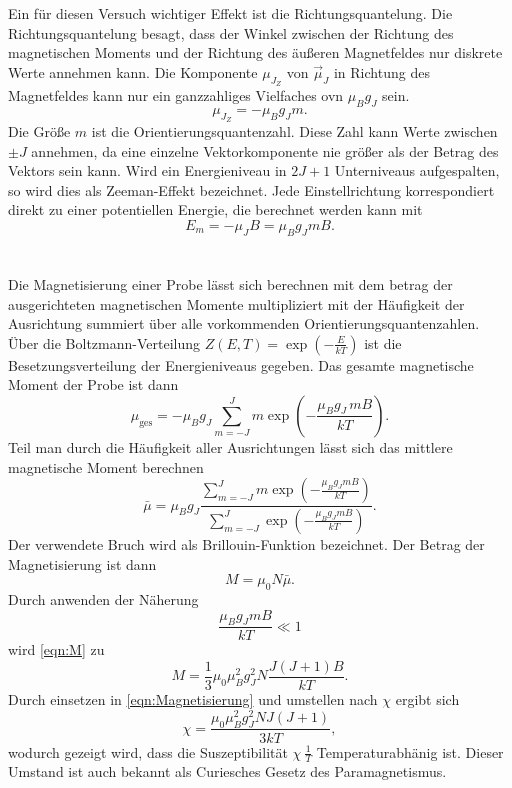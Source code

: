 Ein für diesen Versuch wichtiger Effekt ist die Richtungsquantelung.
Die Richtungsquantelung besagt, dass der Winkel zwischen der Richtung des magnetischen Moments und der Richtung des äußeren Magnetfeldes nur diskrete Werte annehmen kann.
Die Komponente $μ_{J_Z}$ von $\vec{μ}_J$ in Richtung des Magnetfeldes kann nur ein ganzzahliges Vielfaches ovn $μ_B g_J$ sein.
\begin{equation*}
    μ_{J_Z} = - μ_B g_J m.
\end{equation*}
Die Größe $m$ ist die Orientierungsquantenzahl. 
Diese Zahl kann Werte zwischen $\pm J$ annehmen, da eine einzelne Vektorkomponente nie größer als der Betrag des Vektors sein kann.
Wird ein Energieniveau in $2J+1$ Unterniveaus aufgespalten, so wird dies als Zeeman-Effekt bezeichnet.
Jede Einstellrichtung korrespondiert direkt zu einer potentiellen Energie, die berechnet werden kann mit
\begin{equation*}
    E_m = - μ_{J} B = μ_B g_J m B.
\end{equation*}
\\
\\
Die Magnetisierung einer Probe lässt sich berechnen mit dem betrag der ausgerichteten magnetischen Momente 
multipliziert mit der Häufigkeit der Ausrichtung summiert über alle vorkommenden Orientierungsquantenzahlen.
Über die Boltzmann-Verteilung $Z(E,T) = \exp(-\frac{E}{kT})$ ist die Besetzungsverteilung der Energieniveaus gegeben.
Das gesamte magnetische Moment der Probe ist dann
\begin{equation*}
    μ_{\text{ges}} = -μ_B g_J \sum_{m=-J}^{J} m \exp(-\frac{μ_B g_J\, m B}{kT}).
\end{equation*}
Teil man durch die Häufigkeit aller Ausrichtungen lässt sich das mittlere magnetische Moment berechnen
\begin{equation*}
    \bar{μ} = μ_B g_J \frac{\sum_{m=-J}^{J} m \exp(-\frac{μ_B g_J m B}{kT})}{\sum_{m=-J}^{J} \exp(-\frac{μ_B g_J m B}{kT})}.
\end{equation*}
Der verwendete Bruch wird als Brillouin-Funktion bezeichnet.
Der Betrag der Magnetisierung ist dann
\begin{equation}\label{eqn:M}
    M = μ_0 N \bar{μ}.
\end{equation}
Durch anwenden der Näherung
\begin{equation*}
    \frac{μ_B g_J m B}{kT} \ll 1
\end{equation*}
wird \autoref{eqn:M} zu
\begin{equation*}
    M = \frac{1}{3}μ_0 μ_B^2 g_J^2 N \frac{J(J + 1)B}{kT}.
\end{equation*}
Durch einsetzen in \autoref{eqn:Magnetisierung} und umstellen nach $χ$ ergibt sich
\begin{equation}\label{eqn:chi}
    χ = \frac{μ_0 μ_B^2 g_J^2 N J(J+1)}{3kT},
\end{equation}
wodurch gezeigt wird, dass die Suszeptibilität $χ ~ \frac{1}{T}$ Temperaturabhänig ist.
Dieser Umstand ist auch bekannt als Curiesches Gesetz des Paramagnetismus.

